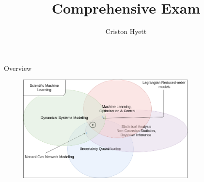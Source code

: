 \title{Comprehensive Exam}
\author{Criston Hyett}
\graphicspath{{./figs/}}
\begin{frame}
  \maketitle
\end{frame}

\begin{frame}{Overview}
  \begin{figure}
    \centering
    \includegraphics[width=0.8\textwidth]{overview.png}
  \end{figure}
\end{frame}
